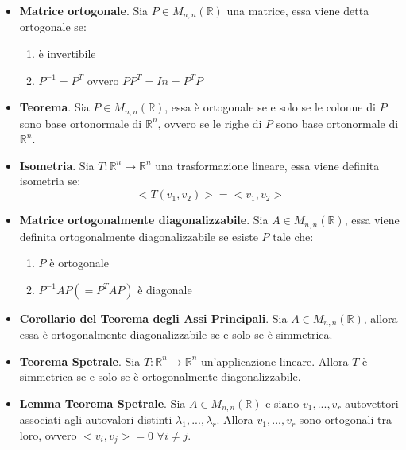 \documentclass[12pt,a4paper,oneside]{book}
\begin{document}
\begin{itemize}

\item \textbf{Matrice ortogonale}. \linebreak
	  Sia $P\in M_{n, n}(\mathbb{R})$ una matrice, essa viene detta ortogonale se:
	  
	  \begin{enumerate}
	  \item è invertibile
	  \item $P^{-1} = P^T$ ovvero $PP^T = In = P^TP$
	  \end{enumerate}
	
\item \textbf{Teorema}. \linebreak
	  Sia $P\in M_{n, n}(\mathbb{R})$, essa è ortogonale se e solo se le colonne di $P$ sono base 
	  ortonormale di $\mathbb{R}^n$, ovvero se le righe di $P$ sono base ortonormale di $\mathbb{R}^n$.
	
\item \textbf{Isometria}. \linebreak
	  Sia $T: \mathbb{R}^n \rightarrow \mathbb{R}^n$ una trasformazione lineare, essa viene definita 
	  isometria se: $$<T(v_1, v_2)> = <v_1, v_2>$$
	
\item \textbf{Matrice ortogonalmente diagonalizzabile}. \linebreak
	  Sia $A\in M_{n, n}(\mathbb{R})$, essa viene definita ortogonalmente diagonalizzabile se esiste $P$
	  tale che:
	  
	  \begin{enumerate}
	  \item $P$ è ortogonale
	  \item $P^{-1}AP (= P^TAP)$ è diagonale
	  \end{enumerate}
	
\item \textbf{Corollario del Teorema degli Assi Principali}. \linebreak
	  Sia $A\in M_{n, n}(\mathbb{R})$, allora essa è ortogonalmente diagonalizzabile se e solo se è 
	  simmetrica.
	
\item \textbf{Teorema Spetrale}. \linebreak
	  Sia $T: \mathbb{R}^n \rightarrow \mathbb{R}^n$ un'applicazione lineare. Allora $T$ è simmetrica se e
	  solo se è ortogonalmente diagonalizzabile.
	
\item \textbf{Lemma Teorema Spetrale}. \linebreak
	  Sia $A\in M_{n, n}(\mathbb{R})$ e siano $v_1, ..., v_r$ autovettori associati agli autovalori 
	  distinti $\lambda_1, ..., \lambda_r$. Allora $v_1, ..., v_r$ sono ortogonali tra loro, ovvero $<v_i, 
	  v_j>= 0$ $\forall i\neq j$.

\end{itemize}
\end{document}
